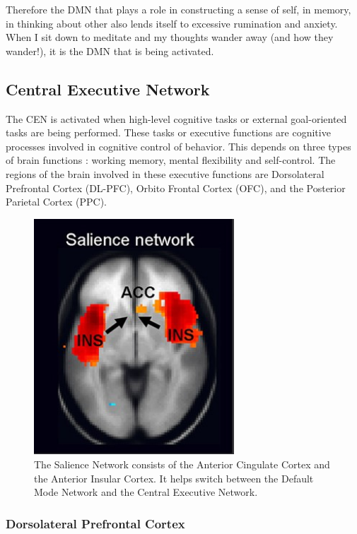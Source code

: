 \documentclass[a4paper, amsfonts, amssymb, amsmath, reprint, showkeys, nofootinbib, twoside]{revtex4-1}
\begin{document}
Therefore the DMN that plays a role in constructing a sense of self, in memory, 
in thinking about other also lends itself to excessive rumination and anxiety. \cite{dmndepression} 
When I sit down to meditate and my thoughts wander away (and how they wander!),
it is the DMN that is being activated. 

\subsection{Central Executive Network}

The CEN is activated when high-level cognitive tasks or external goal-oriented tasks
are being performed. These tasks or executive functions are cognitive processes involved in
cognitive control of behavior. This depends on three types of brain functions : working memory,
mental flexibility and self-control. 
The regions of the brain involved in these executive functions are 
Dorsolateral Prefrontal Cortex (DL-PFC), Orbito Frontal Cortex (OFC),
and the Posterior Parietal Cortex (PPC).

\begin{figure}[H]
  \centering
  \includegraphics[width=7.5cm]{images/top-sn.jpg}
  \caption{The Salience Network consists of the Anterior Cingulate Cortex and the
    Anterior Insular Cortex. It helps switch between the Default Mode Network and the
  Central Executive Network.}
  \label{fig:top-sn}
\end{figure}

\subsubsection{Dorsolateral Prefrontal Cortex}
\end{document}
